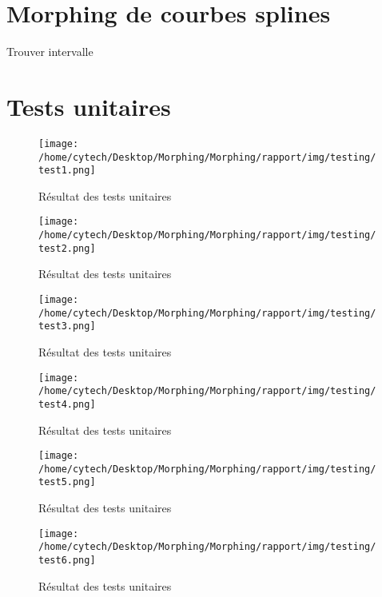 \section[Splines]{Morphing de courbes splines}
\begin{algorithm}
    \caption{Trouver intervalle}
    \label{algo:trouver-intervalle}
\end{algorithm}
\section{Tests unitaires}
\begin{figure}
    \centering
    \texttt{[image: /home/cytech/Desktop/Morphing/Morphing/rapport/img/testing/test1.png]}
    \caption{Résultat des tests unitaires}
    \label{fig:tests1}
\end{figure}
\begin{figure}
    \centering
    \texttt{[image: /home/cytech/Desktop/Morphing/Morphing/rapport/img/testing/test2.png]}
    \caption{Résultat des tests unitaires}
    \label{fig:tests2}
\end{figure}
\begin{figure}
    \centering
    \texttt{[image: /home/cytech/Desktop/Morphing/Morphing/rapport/img/testing/test3.png]}
    \caption{Résultat des tests unitaires}
    \label{fig:tests3}
\end{figure}
\begin{figure}
    \centering
    \texttt{[image: /home/cytech/Desktop/Morphing/Morphing/rapport/img/testing/test4.png]}
    \caption{Résultat des tests unitaires}
    \label{fig:tests4}
\end{figure}
\begin{figure}
    \centering
    \texttt{[image: /home/cytech/Desktop/Morphing/Morphing/rapport/img/testing/test5.png]}
    \caption{Résultat des tests unitaires}
    \label{fig:tests5}
\end{figure}
\begin{figure}
    \centering
    \texttt{[image: /home/cytech/Desktop/Morphing/Morphing/rapport/img/testing/test6.png]}
    \caption{Résultat des tests unitaires}
    \label{fig:tests6}
\end{figure}

